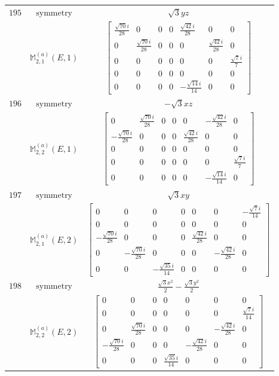\documentclass[fleqn,8pt,landscape]{jsarticle}
\begin{document}
\begin{longtable}{ccc}
$ 195 $ & $ \text{symmetry} $ & $ \sqrt{3} y z $ \\
$  $ & $ \mathbb{M}_{2,1}^{(a)}(E,1) $ & $ \begin{bmatrix} \frac{\sqrt{70} i}{28} & 0 & 0 & 0 & \frac{\sqrt{42} i}{28} & 0 & 0 \\ 0 & \frac{\sqrt{70} i}{28} & 0 & 0 & 0 & \frac{\sqrt{42} i}{28} & 0 \\ 0 & 0 & 0 & 0 & 0 & 0 & \frac{\sqrt{7} i}{7} \\ 0 & 0 & 0 & 0 & 0 & 0 & 0 \\ 0 & 0 & 0 & 0 & - \frac{\sqrt{14} i}{14} & 0 & 0 \end{bmatrix} $ \\ \hline
$ 196 $ & $ \text{symmetry} $ & $ - \sqrt{3} x z $ \\
$  $ & $ \mathbb{M}_{2,2}^{(a)}(E,1) $ & $ \begin{bmatrix} 0 & \frac{\sqrt{70} i}{28} & 0 & 0 & 0 & - \frac{\sqrt{42} i}{28} & 0 \\ - \frac{\sqrt{70} i}{28} & 0 & 0 & 0 & \frac{\sqrt{42} i}{28} & 0 & 0 \\ 0 & 0 & 0 & 0 & 0 & 0 & 0 \\ 0 & 0 & 0 & 0 & 0 & 0 & \frac{\sqrt{7} i}{7} \\ 0 & 0 & 0 & 0 & 0 & - \frac{\sqrt{14} i}{14} & 0 \end{bmatrix} $ \\ \hline
$ 197 $ & $ \text{symmetry} $ & $ \sqrt{3} x y $ \\
$  $ & $ \mathbb{M}_{2,1}^{(a)}(E,2) $ & $ \begin{bmatrix} 0 & 0 & 0 & 0 & 0 & 0 & - \frac{\sqrt{7} i}{14} \\ 0 & 0 & 0 & 0 & 0 & 0 & 0 \\ - \frac{\sqrt{70} i}{28} & 0 & 0 & 0 & \frac{\sqrt{42} i}{28} & 0 & 0 \\ 0 & - \frac{\sqrt{70} i}{28} & 0 & 0 & 0 & - \frac{\sqrt{42} i}{28} & 0 \\ 0 & 0 & - \frac{\sqrt{35} i}{14} & 0 & 0 & 0 & 0 \end{bmatrix} $ \\ \hline
$ 198 $ & $ \text{symmetry} $ & $ \frac{\sqrt{3} x^{2}}{2} - \frac{\sqrt{3} y^{2}}{2} $ \\
$  $ & $ \mathbb{M}_{2,2}^{(a)}(E,2) $ & $ \begin{bmatrix} 0 & 0 & 0 & 0 & 0 & 0 & 0 \\ 0 & 0 & 0 & 0 & 0 & 0 & \frac{\sqrt{7} i}{14} \\ 0 & \frac{\sqrt{70} i}{28} & 0 & 0 & 0 & - \frac{\sqrt{42} i}{28} & 0 \\ - \frac{\sqrt{70} i}{28} & 0 & 0 & 0 & - \frac{\sqrt{42} i}{28} & 0 & 0 \\ 0 & 0 & 0 & \frac{\sqrt{35} i}{14} & 0 & 0 & 0 \end{bmatrix} $ \\ \hline

\end{longtable}
\end{document}

